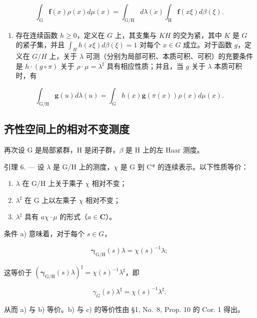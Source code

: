\[
\int_ {\mathrm{G}} \mathbf {f} (x) \rho (x) d \mu (x) = \int_ {\mathrm{G/H}} d \lambda (\dot {x}) \int_ {\mathrm{H}} \mathbf {f} (x \xi) d \beta (\xi).
\]

\begin{enumerate}
\def\labelenumi{\alph{enumi})}
\setcounter{enumi}{3}
\tightlist
\item
  存在连续函数 \(h \geqslant 0\)，定义在 \(G\) 上，其支集与 \(KH\) 的交为紧，其中 \(K\) 是 \(G\) 的紧子集，并且 \(\int_{H} h(x\xi) d\beta(\xi) = 1\) 对每个 \(x \in G\) 成立。对于函数 \(g\)，定义在 \(G/H\) 上，关于 \(\lambda\) 可测（分别为局部可积、本质可积、可积）的充要条件是 \(h \cdot (g \circ \pi)\) 关于 \(\rho \cdot \mu = \lambda^{\sharp}\) 具有相应性质；并且，当 \(g\) 关于 \(\lambda\) 本质可积时，有
\end{enumerate}

\[
\int_ {\mathrm{G/H}} \mathbf {g} (u) d \lambda (u) = \int_ {\mathrm{G}} h (x) \mathbf {g} (\pi (x)) \rho (x) d \mu (x).
\]

\subsection{齐性空间上的相对不变测度}

再次设 G 是局部紧群，H 是闭子群，\(\beta\) 是 H 上的左 Haar 测度。

引理 6. --- 设 \(\lambda\) 是 G/H 上的测度，\(\chi\) 是 G 到 C* 的连续表示。以下性质等价：

\begin{enumerate}
\def\labelenumi{\alph{enumi})}
\item
  \(\lambda\) 在 G/H 上关于乘子 \(\chi\) 相对不变；
\item
  \(\lambda^{\sharp}\) 在 G 上以左乘子 \(\chi\) 相对不变；
\item
  \(\lambda^{\sharp}\) 具有 \(a\chi \cdot \mu\) 的形式（\(a \in \mathbf{C}\)）。
\end{enumerate}

条件 a) 意味着，对于每个 \(s \in G\)，

\[
\pmb {\gamma} _ {\mathrm{G/H}} (s) \lambda = \chi (s) ^ {- 1} \lambda ;
\]

这等价于 \(\left(\pmb{\gamma}_{\mathrm{G / H}}(s)\lambda\right)^{\sharp} = \chi (s)^{-1}\lambda^{\sharp}\)，即

\[
\gamma_ {G} (s) \lambda^ {\sharp} = \chi (s) ^ {- 1} \lambda^ {\sharp}.
\]

从而 a) 与 b) 等价。b) 与 c) 的等价性由 §1, No.~8, Prop. 10 的 Cor. 1 得出。

